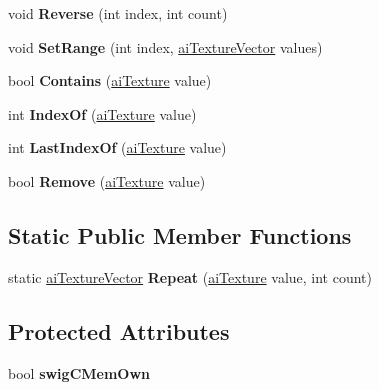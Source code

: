 \begin{DoxyCompactItemize}
\item 
\hypertarget{classai_texture_vector_ad41897b3cf452f564c37a42b65c526ba}{void {\bfseries Reverse} (int index, int count)}\label{classai_texture_vector_ad41897b3cf452f564c37a42b65c526ba}

\item 
\hypertarget{classai_texture_vector_a42b94b10abe68157ef6355067cab6876}{void {\bfseries Set\+Range} (int index, \hyperlink{classai_texture_vector}{ai\+Texture\+Vector} values)}\label{classai_texture_vector_a42b94b10abe68157ef6355067cab6876}

\item 
\hypertarget{classai_texture_vector_a3d635f68e104669f77959bdce9a56ede}{bool {\bfseries Contains} (\hyperlink{structai_texture}{ai\+Texture} value)}\label{classai_texture_vector_a3d635f68e104669f77959bdce9a56ede}

\item 
\hypertarget{classai_texture_vector_ae12a19b6fc1b2257bdd21f0e20ef37f9}{int {\bfseries Index\+Of} (\hyperlink{structai_texture}{ai\+Texture} value)}\label{classai_texture_vector_ae12a19b6fc1b2257bdd21f0e20ef37f9}

\item 
\hypertarget{classai_texture_vector_aa712bda4ec7433f77a3aaecc96ccb3b7}{int {\bfseries Last\+Index\+Of} (\hyperlink{structai_texture}{ai\+Texture} value)}\label{classai_texture_vector_aa712bda4ec7433f77a3aaecc96ccb3b7}

\item 
\hypertarget{classai_texture_vector_aa1cabcfbaa7ce00fb5b30a8d7aeec0bd}{bool {\bfseries Remove} (\hyperlink{structai_texture}{ai\+Texture} value)}\label{classai_texture_vector_aa1cabcfbaa7ce00fb5b30a8d7aeec0bd}

\end{DoxyCompactItemize}
\subsection*{Static Public Member Functions}
\begin{DoxyCompactItemize}
\item 
\hypertarget{classai_texture_vector_a99ea0d8773398e6d1fbf5a3392d06176}{static \hyperlink{classai_texture_vector}{ai\+Texture\+Vector} {\bfseries Repeat} (\hyperlink{structai_texture}{ai\+Texture} value, int count)}\label{classai_texture_vector_a99ea0d8773398e6d1fbf5a3392d06176}

\end{DoxyCompactItemize}
\subsection*{Protected Attributes}
\begin{DoxyCompactItemize}
\item 
\hypertarget{classai_texture_vector_a65e45c9c9cea0529fbc0ea4f1cf841c7}{bool {\bfseries swig\+C\+Mem\+Own}}\label{classai_texture_vector_a65e45c9c9cea0529fbc0ea4f1cf841c7}

\end{DoxyCompactItemize}
